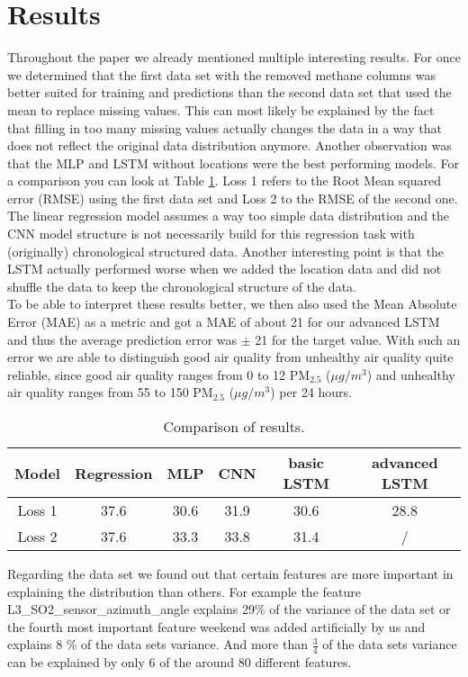 \documentclass{article}
\begin{document}
\section{Results}
Throughout the paper we already mentioned multiple interesting results. For once we determined that the first data set with the removed methane columns was better suited for training and predictions than the second data set that used the mean to replace missing values. This can most likely be explained by the fact that filling in too many missing values actually changes the data in a way that does not reflect the original data distribution anymore. Another observation was that the MLP and LSTM without locations were the best performing models. For a comparison you can look at Table \ref{table:1}. Loss 1 refers to the Root Mean squared error (RMSE) using the first data set and Loss 2 to the RMSE of the second one. \\
The linear regression model assumes a way too simple data distribution and the CNN model structure is not necessarily build for this regression task with (originally) chronological structured data. Another interesting point is that the LSTM actually performed worse when we added the location data and did not shuffle the data to keep the chronological structure of the data. \\ 
To be able to interpret these results better, we then also used the Mean Absolute Error (MAE) as a metric and got a MAE of about 21 for our advanced LSTM and thus the average prediction error was $\pm$ 21 for the target value. With such an error we are able to distinguish good air quality from unhealthy air quality quite reliable, since good air quality ranges from 0 to 12 PM$_{2.5}$ ($\mu g/m^3$) and unhealthy air quality ranges from 55 to 150 PM$_{2.5}$ ($\mu g/m^3$) per 24 hours.

\begin{table}[h!]
\centering
\begin{tabular}{ |c|c|c|c|c|c| } 
 \hline
 Model & Regression & MLP  & CNN & basic LSTM & advanced LSTM\\ 
 \hline
 Loss 1 & 37.6 & 30.6 & 31.9 & 30.6 & 28.8\\ 
 Loss 2 & 37.6 & 33.3 & 33.8 & 31.4 & / \\ 
 \hline
\end{tabular}
\caption{Comparison of results.}
\label{table:1}
\end{table}

Regarding the data set we found out that certain features are more important in explaining the distribution than others. For example the feature 
{\selectfont L3\_SO2\_sensor\_azimuth\_angle }
explains 29\% of the variance of the data set or the fourth most important feature 
{\selectfont weekend }
was added artificially by us and explains 8 \% of the data sets variance. And more than $\frac{3}{4}$ of the data sets variance can be explained by only 6 of the around 80 different features.
\end{document}
